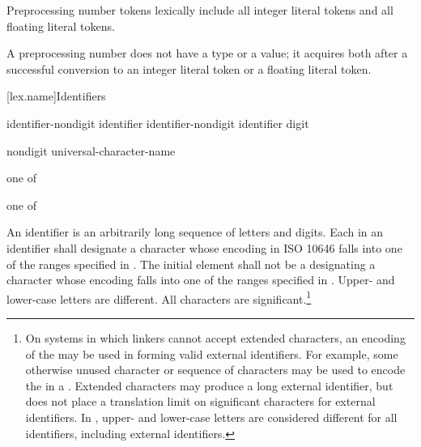 \pnum
Preprocessing number tokens lexically include all integer literal
tokens and all floating literal
tokens.

\pnum
A preprocessing number does not have a type or a value; it acquires both
after a successful conversion to an integer literal token or a floating literal
token.%

[lex.name]{Identifiers}

%
\begin{bnf}
\br
    identifier-nondigit\br
    identifier identifier-nondigit\br
    identifier digit
\end{bnf}

\begin{bnf}
\br
    nondigit\br
    universal-character-name
\end{bnf}

\begin{bnf}
 \textnormal{one of}\br
    \br
    \br
    \br
\end{bnf}

\begin{bnf}
 \textnormal{one of}\br
\end{bnf}

\pnum
{}%
%
An identifier is an arbitrarily long sequence of letters and digits.
Each  in an identifier shall designate a
character whose encoding in ISO 10646 falls into one of the ranges
specified in .
The initial element shall not be a 
designating a character whose encoding falls into one of the ranges
specified in .
Upper- and lower-case letters are
different. All characters are significant.\footnote{On systems in which linkers cannot accept extended
characters, an encoding of the  may be used in
forming valid external identifiers. For example, some otherwise unused
character or sequence of characters may be used to encode the
 in a . Extended
characters may produce a long external identifier, but \Cpp{} does not
place a translation limit on significant characters for external
identifiers. In \Cpp{}, upper- and lower-case letters are considered
different for all identifiers, including external identifiers. }

